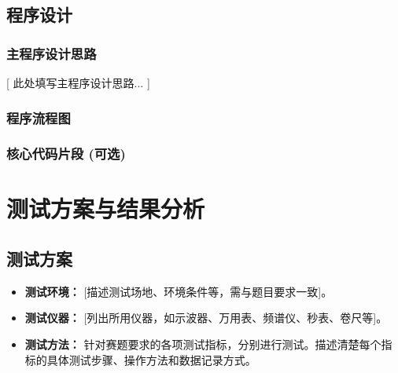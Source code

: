 \documentclass[UTF-8,zihao=-4]{ctexart}
\begin{document}
\subsection{程序设计}
\subsubsection{主程序设计思路}
    [ 此处填写主程序设计思路... ]

\subsubsection{程序流程图}
    
\subsubsection{核心代码片段 (可选)}

\section{测试方案与结果分析}
\subsection{测试方案}
    \begin{itemize}
        \item \textbf{测试环境：} [描述测试场地、环境条件等，需与题目要求一致]。
        \item \textbf{测试仪器：} [列出所用仪器，如示波器、万用表、频谱仪、秒表、卷尺等]。
        \item \textbf{测试方法：} 针对赛题要求的各项测试指标，分别进行测试。描述清楚每个指标的具体测试步骤、操作方法和数据记录方式。
    \end{itemize}
\end{document}
